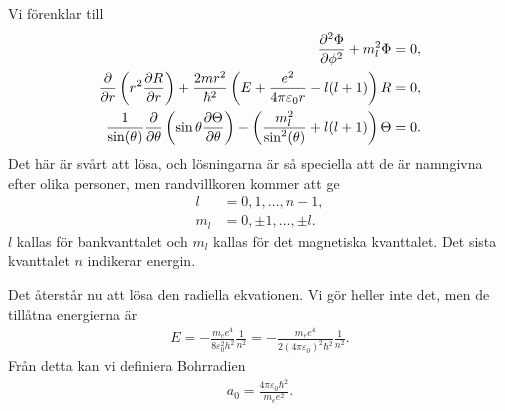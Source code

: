 Vi förenklar till
\begin{align*}
	\pdv[2]{\Phi}{\phi} + m_{l}^{2}\Phi                          &= 0, \\
	\pdv{r}\left(r^{2}\pdv{R}{r}\right) + \frac{2mr^{2}}{\hbar^{2}}\left(E + \frac{e^{2}}{4\pi\varepsilon_{0}r} - l(l + 1)\right)R                        &= 0, \\
	\frac{1}{\sin(\theta)}\pdv{\theta}\left(\sin{\theta}\pdv{\Theta}{\theta}\right) - \left(\frac{m_{l}^{2}}{\sin^{2}(\theta)} + l(l + 1)\right)\Theta &= 0.
\end{align*}
Det här är svårt att lösa, och lösningarna är så speciella att de är namngivna efter olika personer, men randvillkoren kommer att ge
\begin{align*}
	l     &= 0, 1, \dots, n - 1, \\
	m_{l} &= 0, \pm 1, \dots, \pm l.
\end{align*}
$l$ kallas för bankvanttalet och $m_{l}$ kallas för det magnetiska kvanttalet. Det sista kvanttalet $n$ indikerar energin.

Det återstår nu att lösa den radiella ekvationen. Vi gör heller inte det, men de tillåtna energierna är
\begin{align*}
	E = -\frac{m_{e}e^{4}}{8\varepsilon_{0}^{2}h^{2}}\frac{1}{n^{2}} = -\frac{m_{e}e^{4}}{2(4\pi\varepsilon_{0})^{2}\hbar^{2}}\frac{1}{n^{2}}.
\end{align*}
Från detta kan vi definiera Bohrradien
\begin{align*}
	a_{0} = \frac{4\pi\varepsilon_{0}\hbar^{2}}{m_{e}e^{2}}.
\end{align*}